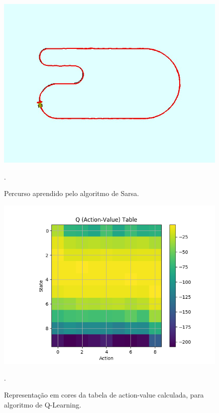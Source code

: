 \documentclass[conference]{IEEEtran}
\begin{document}
\begin{figure}[htbp]
\centering
\centerline{\includegraphics[scale=0.25]{imagens/sarsa/line_follower_solution.jpeg}}
\caption{Percurso aprendido pelo algoritmo de Sarsa.}.
\label{sarsa/line_follower_solution}
\end{figure}

\begin{figure}[htbp]
\centering
\centerline{\includegraphics[scale=0.5]{imagens/q-learning/action_value_table.png}}
\caption{Representação em cores da tabela de action-value calculada, para algoritmo de Q-Learning.}.
\label{q-learning/action_value_table}
\end{figure}
\end{document}
